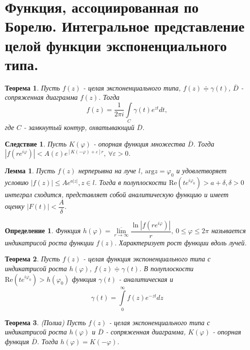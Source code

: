 \documentclass[9pt]{article}
\newtheorem{theorem}{Теорема} %
\newtheorem{lemma}{Лемма} %
\newtheorem{definition}{Определение}
\newtheorem*{corollary*}{Следствие}
\begin{document}
			\section{Функция, ассоциированная по Борелю. Интегральное представление целой функции экспоненциального типа.}
			\begin{theorem}
				Пусть $f(z)$ - целая экспоненциального типа, $f(z) \doteqdot \gamma(t)$, $\overline{D}$ - сопряженная диаграмма $f(z)$. Тогда
				$$
					f(z) = \dfrac1{2\pi i} \int\limits_C \gamma(t) e^{zt} dt,
				$$
				где $C$ - замкнутый контур, охватывающий  $\overline{D}$.
			\end{theorem}
			\begin{corollary*}
				Пусть $K(\varphi)$ - опорная функция множества $\overline{D}$. Тогда $|f(re^{i\varphi})| < A(\varepsilon) e^{\left[K(-\varphi)+\varepsilon\right]r}, \ \forall \varepsilon > 0$.
			\end{corollary*}
			\begin{lemma}
				Пусть $f(z)$ нерперывна на луче $l$, $\mathrm{arg} z = \varphi_0$ и удовлетворяет условию $|f(z)| \leq A e^{a|z|}, z \in l$. Тогда в полуплоскости $\mathrm{Re} (t e^{i\varphi_0}) > a + \delta, \delta >0$  интеграл сходится, представляет собой аналитическую функцию и имеет оценку $|F(t)| < \dfrac{A}{\delta}$.	
			\end{lemma}
			
			\begin{definition}
				Функция $h(\varphi) = \overline{\lim\limits_{r \to \infty}}\dfrac{\ln{|f(re^{i\varphi})|}}{r}, \ 0 \leq \varphi \leq 2\pi$ называется индикатрисой роста функции $f(z)$. Характеризует рост функции вдоль лучей.
			\end{definition}
			\begin{theorem}
				Пусть $f(z)$ - целая функция экспоненциального типа с индикатрисой роста $h(\varphi)$, $f(z) \doteqdot \gamma(t)$. В полуплоскости $\mathrm{Re}(te^{i\varphi_0}) > h(\varphi_0)$ функция $\gamma(t)$ - аналитическая и 
				$$
				\gamma(t) = \int\limits_0^\infty f(z) e^{-zt} dz
				$$
			\end{theorem}
			\begin{theorem}(Полиа)\newline
				Пусть $f(z)$  - целая экспоненциального типа с индикатрисой роста $h(\varphi)$ и $\overline{D}$ - сопряженная диаграмма, $K(\varphi)$ - опорная функция $\overline{D}$. Тогда $h(\varphi) = K(-\varphi)$.
			\end{theorem}
\end{document}
